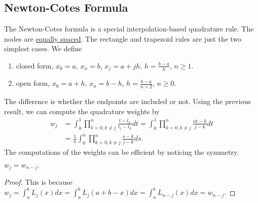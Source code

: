 \subsection{Newton-Cotes Formula}
\label{SSec: 3-NEW-COT-FOR}
The Newton-Cotes formula is a special interpolation-based quadrature rule. The nodes are \underline{equally spaced}. The rectangle and trapezoid rules are just the two simplest cases. We define 
\begin{enumerate}
    \item closed form, $x_0 = a$, $x_n = b$, $x_j = a  + jh$, $h = \frac{b-a}{h}$, $n\ge 1$. 
    \item open form, $x_0 = a + h$, $x_n = b - h$, $h = \frac{b-a}{n+2}$, $n\ge 0$.
\end{enumerate}
The difference is whether the endpoints are included or not. Using the previous result, we can compute the quadrature weights by 
\begin{equation}
    \begin{aligned}
        w_j &= \int_0^1 \prod_{k=0, k\neq j}^n \frac{t - t_k}{t_j - t_k} dt =  \int_0^1 \prod_{k=0, k\neq j}^n \frac{nt - k}{j- k} dt \\
        &=\frac{1}{n}\int_0^n \prod_{k=0, k\neq j}^n \frac{s - k}{j - k} ds. 
    \end{aligned}
\end{equation}
The computations of the weights can be efficient by noticing the symmetry. 
\begin{lemma} $w_j = w_{n - j}.$
\end{lemma}
\begin{proof}
    This is because $w_j = \int_a^b L_j(x) dx = \int_a^b L_j(a + b - x) dx = \int_a^b L_{n-j}(x) dx = w_{n-j}.$
\end{proof}


